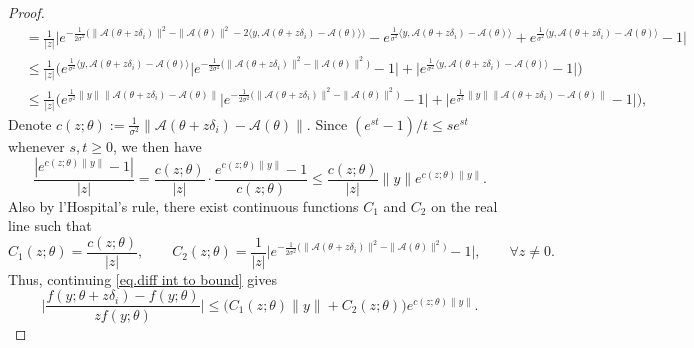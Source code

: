 \documentclass[times,10pt]{elsarticle}
\theoremstyle{plain}
\begin{document}
\begin{proof}
\begin{align}
&=\frac{1}{|z|}\Big|e^{-\frac{1}{2\sigma^2}\big(\|\mathcal{A}(\theta+z\delta_i)\|^2-\|\mathcal{A}(\theta)\|^2-2\langle y,\mathcal{A}(\theta+z\delta_i)-\mathcal{A}(\theta)\rangle\big)}-e^{\frac{1}{\sigma^2}\langle y,\mathcal{A}(\theta+z\delta_i)-\mathcal{A}(\theta)\rangle}%
+e^{\frac{1}{\sigma^2}\langle y,\mathcal{A}(\theta+z\delta_i)-\mathcal{A}(\theta)\rangle}-1\Big|\\
\nonumber
&\leq\frac{1}{|z|}\bigg(e^{\frac{1}{\sigma^2}\langle y,\mathcal{A}(\theta+z\delta_i)-\mathcal{A}(\theta)\rangle}\Big|e^{-\frac{1}{2\sigma^2}\big(\|\mathcal{A}(\theta+z\delta_i)\|^2-\|\mathcal{A}(\theta)\|^2\big)}-1\Big|+\Big|e^{\frac{1}{\sigma^2}\langle y,\mathcal{A}(\theta+z\delta_i)-\mathcal{A}(\theta)\rangle}-1\Big|\bigg)\\
\label{eq.diff int to bound}
&\leq\frac{1}{|z|}\bigg(e^{\frac{1}{\sigma^2}\|y\|\|\mathcal{A}(\theta+z\delta_i)-\mathcal{A}(\theta)\|}\Big|e^{-\frac{1}{2\sigma^2}\big(\|\mathcal{A}(\theta+z\delta_i)\|^2-\|\mathcal{A}(\theta)\|^2\big)}-1\Big|+\Big|e^{\frac{1}{\sigma^2}\|y\|\|\mathcal{A}(\theta+z\delta_i)-\mathcal{A}(\theta)\|}-1\Big|\bigg),
\end{align}
Denote $c(z;\theta):=\frac{1}{\sigma^2}\|\mathcal{A}(\theta+z\delta_i)-\mathcal{A}(\theta)\|$.
Since $(e^{st}-1)/t\leq se^{st}$ whenever $s,t\geq0$, we then have
\begin{equation*}
\frac{|e^{c(z;\theta)\|y\|}-1|}{|z|}
=\frac{c(z;\theta)}{|z|}\cdot\frac{e^{c(z;\theta)\|y\|}-1}{c(z;\theta)}
\leq\frac{c(z;\theta)}{|z|}\|y\|e^{c(z;\theta)\|y\|}.
\end{equation*}
Also by l'Hospital's rule, there exist continuous functions $C_1$ and $C_2$ on the real line such that
\begin{equation*}
C_1(z;\theta)
=\frac{c(z;\theta)}{|z|},
\qquad
C_2(z;\theta)
=\frac{1}{|z|}\Big|e^{-\frac{1}{2\sigma^2}\big(\|\mathcal{A}(\theta+z\delta_i)\|^2-\|\mathcal{A}(\theta)\|^2\big)}-1\Big|,
\qquad
\forall z\neq0.
\end{equation*}
Thus, continuing \eqref{eq.diff int to bound} gives
\begin{equation*}
\bigg|\frac{f(y;\theta+z\delta_i)-f(y;\theta)}{zf(y;\theta)}\bigg|
\leq\Big(C_1(z;\theta)\|y\|+C_2(z;\theta)\Big)e^{c(z;\theta)\|y\|}.
\end{equation*}
%
%
%

\end{proof}
\end{document}

